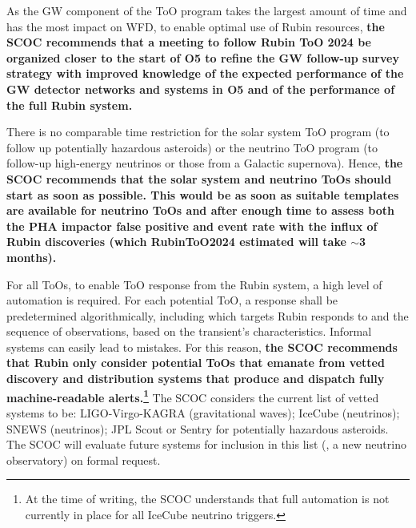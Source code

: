 As the GW component of the ToO program takes the largest amount of time and has the most impact on WFD, to enable optimal use of Rubin resources, {\bf the SCOC recommends that a meeting to follow Rubin ToO 2024 be organized closer to the start of O5 to refine the GW follow-up survey strategy with improved knowledge of the expected performance of the GW detector networks and systems in O5 and of the performance of the full Rubin system.}
%

There is no comparable time restriction for the solar system ToO program (to follow up potentially hazardous asteroids) or the neutrino ToO program (to follow-up high-energy neutrinos or those from a Galactic supernova). Hence, 
\textbf{ the SCOC recommends that the solar system and neutrino ToOs should start as soon as possible. This would be as soon as suitable templates are available for neutrino ToOs and after enough time to assess both the PHA impactor false positive and event rate with the influx of Rubin discoveries (which RubinToO2024 estimated will take $\sim$3 months).}



For all ToOs, to enable ToO response from the Rubin system, a high level of automation is required. For each potential ToO, a response shall be predetermined algorithmically, including which targets Rubin responds to and the sequence of observations, based on the transient’s characteristics. Informal systems can easily lead to mistakes. For this reason, {\bf the SCOC recommends that Rubin only consider potential ToOs that emanate from vetted discovery and distribution systems that produce and dispatch fully machine-readable alerts.\footnote{At the time of writing, the SCOC understands that full automation is not currently in place for all IceCube neutrino triggers.}} The SCOC considers the current list of vetted systems to be: LIGO-Virgo-KAGRA (gravitational waves); IceCube (neutrinos); SNEWS (neutrinos); JPL Scout or Sentry for potentially hazardous asteroids. The SCOC will evaluate future systems for inclusion in this list (\eg , a new neutrino observatory) on formal request.

